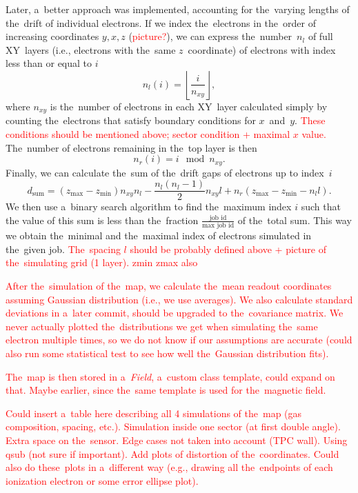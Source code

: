 		Later, a~better approach was implemented, accounting for the~varying lengths of the~drift of individual electrons. If we index the~electrons in the~order of increasing coordinates $y,x,z$ (\textcolor{red}{picture?}), we can express the~number~$n_l$ of full XY~layers (i.e., electrons with the~same $z$~coordinate) of electrons with index less than or equal to $i$
			\begin{equation}
				n_l(i) = \left\lfloor\frac{i}{n_{xy}}\right\rfloor,
			\end{equation}
		where $n_{xy}$ is the~number of electrons in each XY~layer calculated simply by counting the~electrons that satisfy boundary conditions for $x$~and~$y$. \textcolor{red}{These conditions should be mentioned above; sector condition + maximal $x$ value.} The~number of electrons remaining in the~top layer is then
			\begin{equation}
				n_r(i) = i\!\!\!\!\mod n_{xy}.
			\end{equation}
		Finally, we can calculate the~sum of the~drift gaps of electrons up to index~$i$
			\begin{equation}
				d_\text{sum} = (z_\text{max}-z_\text{min})n_{xy}n_l-\frac{n_l(n_l-1)}{2}n_{xy}l+n_r(z_\text{max}-z_\text{min}-n_l l).
			\end{equation}
		We then use a~binary search algorithm to find the~maximum index $i$ such that the value of this sum is less than the~fraction $\frac{\text{job id}}{\text{max job id}}$ of the~total sum. This way we obtain the~minimal and the~maximal index of electrons simulated in the~given job.
		\textcolor{red}{The~spacing $l$ should be probably defined above + picture of the~simulating grid (1 layer). zmin zmax also}
		
		\textcolor{red}{After the~simulation of the~map, we calculate the~mean readout coordinates assuming Gaussian distribution (i.e., we use averages). We also calculate standard deviations in a~later commit, should be upgraded to the~covariance matrix. We never actually plotted the~distributions we get when simulating the~same electron multiple times, so we do not know if our assumptions are accurate (could also run some statistical test to see how well the~Gaussian distribution fits).}
		
		\textcolor{red}{The~map is then stored in a~\textit{Field}, a~custom class template, could expand on that. Maybe earlier, since the~same template is used for the~magnetic field.}
		
		\textcolor{red}{Could insert a~table here describing all 4 simulations of the~map (gas composition, spacing, etc.). Simulation inside one sector (at first double angle). Extra space on the~sensor. Edge cases not taken into account (TPC wall). Using qsub (not sure if important). Add plots of distortion of the~coordinates. Could also do these~plots in a~different way (e.g., drawing all the~endpoints of each ionization electron or some error ellipse plot).}
		
